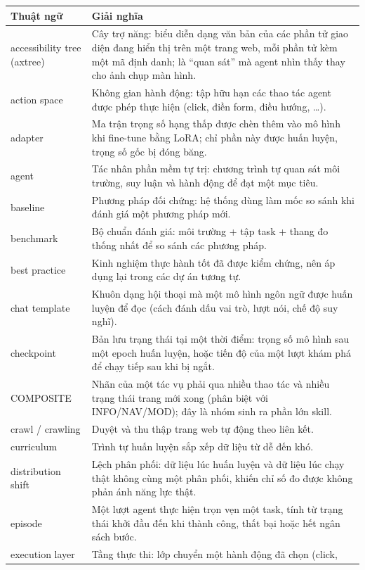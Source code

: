 \begin{longtable}{L{4.2cm} L{9.8cm}}
\toprule
\textbf{Thuật ngữ} & \textbf{Giải nghĩa} \\
\midrule
accessibility tree (axtree) & Cây trợ năng: biểu diễn dạng văn bản của các
phần tử giao diện đang hiển thị trên một trang web, mỗi phần tử kèm một mã
định danh; là ``quan sát'' mà agent nhìn thấy thay cho ảnh chụp màn hình. \\
action space & Không gian hành động: tập hữu hạn các thao tác agent được
phép thực hiện (click, điền form, điều hướng, \dots). \\
adapter & Ma trận trọng số hạng thấp được chèn thêm vào mô hình khi
fine-tune bằng LoRA; chỉ phần này được huấn luyện, trọng số gốc bị đóng băng. \\
agent & Tác nhân phần mềm tự trị: chương trình tự quan sát môi trường,
suy luận và hành động để đạt một mục tiêu. \\
baseline & Phương pháp đối chứng: hệ thống dùng làm mốc so sánh khi đánh
giá một phương pháp mới. \\
benchmark & Bộ chuẩn đánh giá: môi trường + tập task + thang đo thống nhất
để so sánh các phương pháp. \\
best practice & Kinh nghiệm thực hành tốt đã được kiểm chứng, nên áp dụng
lại trong các dự án tương tự. \\
chat template & Khuôn dạng hội thoại mà một mô hình ngôn ngữ được huấn luyện
để đọc (cách đánh dấu vai trò, lượt nói, chế độ suy nghĩ). \\
checkpoint & Bản lưu trạng thái tại một thời điểm: trọng số mô hình sau một
epoch huấn luyện, hoặc tiến độ của một lượt khám phá để chạy tiếp sau khi bị ngắt. \\
COMPOSITE & Nhãn của một tác vụ phải qua nhiều thao tác và nhiều trạng thái trang mới xong (phân biệt với INFO/NAV/MOD); đây là nhóm sinh ra phần lớn skill. \\
crawl / crawling & Duyệt và thu thập trang web tự động theo liên kết. \\
curriculum & Trình tự huấn luyện sắp xếp dữ liệu từ dễ đến khó. \\
distribution shift & Lệch phân phối: dữ liệu lúc huấn luyện và dữ liệu lúc
chạy thật không cùng một phân phối, khiến chỉ số đo được không phản ánh
năng lực thật. \\
episode & Một lượt agent thực hiện trọn vẹn một task, tính từ trạng thái
khởi đầu đến khi thành công, thất bại hoặc hết ngân sách bước. \\
execution layer & Tầng thực thi: lớp chuyển một hành động đã chọn (click,

\end{longtable}
